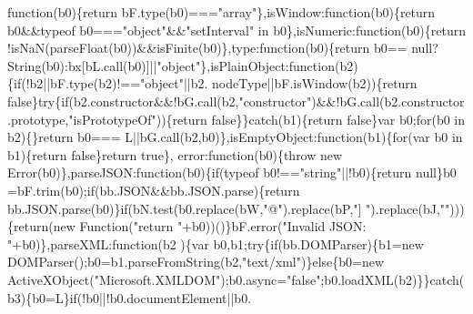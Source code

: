 \begin{DoxyCode}
{      function}(b0)\{\textcolor{keywordflow}{return} bF.type(b0)===\textcolor{stringliteral}{"array"}\},isWindow:\textcolor{keyword}{function}(b0)\{\textcolor{keywordflow}{return} b0&&typeof b0===\textcolor{stringliteral}{"object"}&&\textcolor{stringliteral}{"setInterval"}
       in b0\},isNumeric:\textcolor{keyword}{function}(b0)\{\textcolor{keywordflow}{return} !isNaN(parseFloat(b0))&&isFinite(b0)\},type:\textcolor{keyword}{function}(b0)\{\textcolor{keywordflow}{return} b0==
      null?String(b0):bx[bL.call(b0)]||\textcolor{stringliteral}{"object"}\},isPlainObject:\textcolor{keyword}{function}(b2)\{\textcolor{keywordflow}{if}(!b2||bF.type(b2)!==\textcolor{stringliteral}{"object"}||b2.
      nodeType||bF.isWindow(b2))\{\textcolor{keywordflow}{return} \textcolor{keyword}{false}\}\textcolor{keywordflow}{try}\{\textcolor{keywordflow}{if}(b2.constructor&&!bG.call(b2,\textcolor{stringliteral}{"constructor"})&&!bG.call(b2.constructor
      .prototype,\textcolor{stringliteral}{"isPrototypeOf"}))\{\textcolor{keywordflow}{return} \textcolor{keyword}{false}\}\}\textcolor{keywordflow}{catch}(b1)\{\textcolor{keywordflow}{return} \textcolor{keyword}{false}\}var b0;\textcolor{keywordflow}{for}(b0 in b2)\{\}\textcolor{keywordflow}{return} b0===
      L||bG.call(b2,b0)\},isEmptyObject:\textcolor{keyword}{function}(b1)\{\textcolor{keywordflow}{for}(var b0 in b1)\{\textcolor{keywordflow}{return} \textcolor{keyword}{false}\}\textcolor{keywordflow}{return} \textcolor{keyword}{true}\},
      error:\textcolor{keyword}{function}(b0)\{\textcolor{keywordflow}{throw} \textcolor{keyword}{new} Error(b0)\},parseJSON:\textcolor{keyword}{function}(b0)\{\textcolor{keywordflow}{if}(typeof b0!==\textcolor{stringliteral}{"string"}||!b0)\{\textcolor{keywordflow}{return} null\}b0
      =bF.trim(b0);\textcolor{keywordflow}{if}(bb.JSON&&bb.JSON.parse)\{\textcolor{keywordflow}{return} bb.JSON.parse(b0)\}\textcolor{keywordflow}{if}(bN.test(b0.replace(bW,\textcolor{stringliteral}{"@"}).replace(bP,\textcolor{stringliteral}{"]
      "}).replace(bJ,\textcolor{stringliteral}{""})))\{\textcolor{keywordflow}{return}(\textcolor{keyword}{new} Function(\textcolor{stringliteral}{"return "}+b0))()\}bF.error(\textcolor{stringliteral}{"Invalid JSON: "}+b0)\},parseXML:\textcolor{keyword}{function}(b2
      )\{var b0,b1;\textcolor{keywordflow}{try}\{\textcolor{keywordflow}{if}(bb.DOMParser)\{b1=\textcolor{keyword}{new} DOMParser();b0=b1.parseFromString(b2,\textcolor{stringliteral}{"text/xml"})\}\textcolor{keywordflow}{else}\{b0=\textcolor{keyword}{new} 
      ActiveXObject(\textcolor{stringliteral}{"Microsoft.XMLDOM"});b0.async=\textcolor{stringliteral}{"false"};b0.loadXML(b2)\}\}\textcolor{keywordflow}{catch}(b3)\{b0=L\}\textcolor{keywordflow}{if}(!b0||!b0.documentElement||b0.

\end{DoxyCode}

